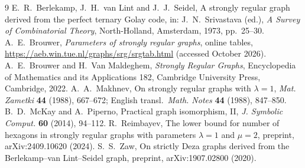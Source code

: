 \documentclass[11pt]{amsart}
\theoremstyle{remark}
\begin{document}
\begin{thebibliography}{9}
 E.~R.~Berlekamp, J.~H.~van Lint and J.~J.~Seidel, A strongly regular graph derived from the perfect
ternary Golay code, in: J.~N.~Srivastava (ed.), \emph{A Survey of Combinatorial Theory}, North-Holland, Amsterdam,
1973, pp.~25--30.
 A.~E.~Brouwer, \emph{Parameters of strongly regular graphs}, online tables,
\url{https://aeb.win.tue.nl/graphs/srg/srgtab.html} (accessed October 2026).
 A.~E.~Brouwer and H.~Van Maldeghem, \emph{Strongly Regular Graphs}, Encyclopedia of Mathematics and its
Applications 182, Cambridge University Press, Cambridge, 2022.
 A.~A.~Makhnev, On strongly regular graphs with $\lambda=1$, \emph{Mat. Zametki} \textbf{44} (1988),
667--672; English transl.\ \emph{Math. Notes} \textbf{44} (1988), 847--850.
 B.~D.~McKay and A.~Piperno, Practical graph isomorphism, II, \emph{J. Symbolic Comput.}
\textbf{60} (2014), 94--112.
 R.~Reimbayev, The lower bound for number of hexagons in strongly regular graphs with parameters
$\lambda=1$ and $\mu=2$, preprint, arXiv:2409.10620 (2024).
 S.~S.~Zaw, On strictly Deza graphs derived from the Berlekamp--van Lint--Seidel graph, preprint,
arXiv:1907.02800 (2020).
\end{thebibliography}
\end{document}
